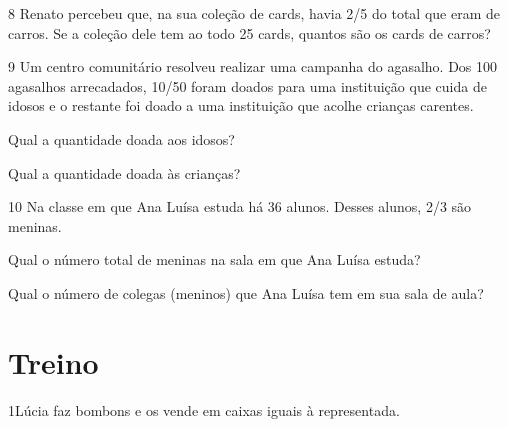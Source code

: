 
\pagebreak
\num{8} Renato percebeu que, na sua coleção de cards, havia 2/5 do total que eram de carros. Se a coleção dele tem ao todo 25 cards,
quantos são os cards de carros?


\bigskip
\bigskip
\bigskip

\num{9} Um centro comunitário resolveu realizar uma campanha do agasalho.
Dos 100 agasalhos arrecadados, 10/50 foram doados para uma instituição
que cuida de idosos e o restante foi doado a uma instituição que acolhe
crianças carentes.

\begin{escolha}
\item
  Qual a quantidade doada aos idosos?

\bigskip
\bigskip

\item
  Qual a quantidade doada às crianças?

\bigskip
\bigskip
\end{escolha}

\num{10} Na classe em que Ana Luísa estuda há 36 alunos. Desses alunos, 2/3 são meninas.

\begin{escolha}
\item
  Qual o número total de meninas na sala em que Ana Luísa estuda?

\bigskip
\bigskip

\item
  Qual o número de colegas (meninos) que Ana Luísa tem em sua sala de aula?

\bigskip
\bigskip
\end{escolha}

\pagebreak
\section{Treino}

\num{1}Lúcia faz bombons e os vende em caixas iguais à representada.

